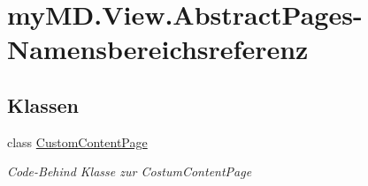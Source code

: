 \hypertarget{namespacemy_m_d_1_1_view_1_1_abstract_pages}{}\section{my\+M\+D.\+View.\+Abstract\+Pages-\/\+Namensbereichsreferenz}
\label{namespacemy_m_d_1_1_view_1_1_abstract_pages}
\subsection*{Klassen}
\begin{DoxyCompactItemize}
\item 
class \mbox{\hyperlink{classmy_m_d_1_1_view_1_1_abstract_pages_1_1_custom_content_page}{Custom\+Content\+Page}}
\begin{DoxyCompactList}\small\item\em Code-\/\+Behind Klasse zur Costum\+Content\+Page \end{DoxyCompactList}\end{DoxyCompactItemize}
